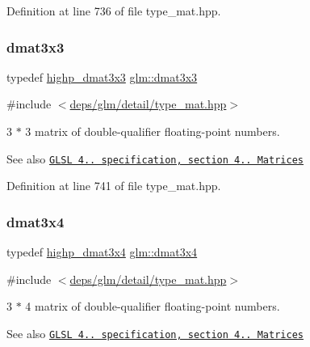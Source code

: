 Definition at line 736 of file type\+\_\+mat.\+hpp.

\mbox{\label{group__core__types_gaf3c29c4f75a448f308463e75ca2efd4c}} 
\subsubsection{\texorpdfstring{dmat3x3}{dmat3x3}}
{\footnotesize\ttfamily typedef \hyperlink{group__core__precision_gae5f677e4437523476511c84a17206ac2}{highp\+\_\+dmat3x3} \hyperlink{group__core__types_gaf3c29c4f75a448f308463e75ca2efd4c}{glm\+::dmat3x3}}



{\ttfamily \#include $<$\hyperlink{type__mat_8hpp}{deps/glm/detail/type\+\_\+mat.\+hpp}$>$}

3 $\ast$ 3 matrix of double-\/qualifier floating-\/point numbers.

\begin{DoxySeeAlso}{See also}
\href{http://www.opengl.org/registry/doc/GLSLangSpec.4.20.8.pdf}{\tt G\+L\+SL 4.. specification, section 4.. Matrices} 
\end{DoxySeeAlso}


Definition at line 741 of file type\+\_\+mat.\+hpp.

\mbox{\label{group__core__types_ga19e745a83cba85f57afa1232276dcc96}} 
\subsubsection{\texorpdfstring{dmat3x4}{dmat3x4}}
{\footnotesize\ttfamily typedef \hyperlink{group__core__precision_ga21d3883c59ff3949404de6713e86c89e}{highp\+\_\+dmat3x4} \hyperlink{group__core__types_ga19e745a83cba85f57afa1232276dcc96}{glm\+::dmat3x4}}



{\ttfamily \#include $<$\hyperlink{type__mat_8hpp}{deps/glm/detail/type\+\_\+mat.\+hpp}$>$}

3 $\ast$ 4 matrix of double-\/qualifier floating-\/point numbers.

\begin{DoxySeeAlso}{See also}
\href{http://www.opengl.org/registry/doc/GLSLangSpec.4.20.8.pdf}{\tt G\+L\+SL 4.. specification, section 4.. Matrices} 
\end{DoxySeeAlso}


